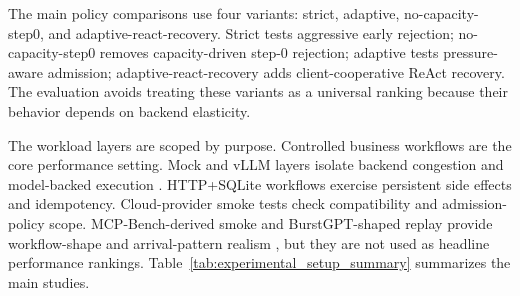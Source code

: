 \documentclass[5p,times]{elsarticle}
\begin{document}
The main policy comparisons use four variants: strict, adaptive, no-capacity-step0, and adaptive-react-recovery. Strict tests aggressive early rejection; no-capacity-step0 removes capacity-driven step-0 rejection; adaptive tests pressure-aware admission; adaptive-react-recovery adds client-cooperative ReAct recovery. The evaluation avoids treating these variants as a universal ranking because their behavior depends on backend elasticity.

The workload layers are scoped by purpose. Controlled business workflows are the core performance setting. Mock and vLLM layers isolate backend congestion and model-backed execution \citep{kwon2023vllm}. HTTP+SQLite workflows exercise persistent side effects and idempotency. Cloud-provider smoke tests check compatibility and admission-policy scope. MCP-Bench-derived smoke and BurstGPT-shaped replay provide workflow-shape and arrival-pattern realism \citep{mcpbench2025,wang2024burstgpt}, but they are not used as headline performance rankings. Table~\ref{tab:experimental_setup_summary} summarizes the main studies.
\end{document}
